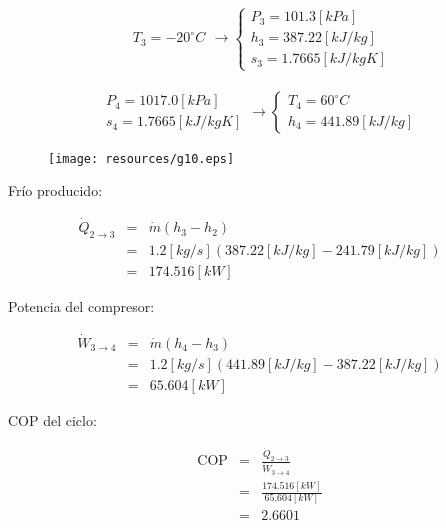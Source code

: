 \documentclass[letter,10pt]{article}
\begin{document}
\begin{enumerate}
\begin{eqnarray*}
    \begin{array}{c}
        T_3 = -20^\circ C
    \end{array}
    \rightarrow
    \begin{cases}
        P_3 = 101.3[kPa] \\
        h_3 = 387.22[kJ/kg] \\
        s_3 = 1.7665[kJ/kg K]
    \end{cases}
\end{eqnarray*}

\begin{eqnarray*}
    \begin{array}{c}
        P_4 = 1017.0[kPa] \\
        s_4 = 1.7665[kJ/kg K]
    \end{array}
    \rightarrow
    \begin{cases}
        T_4 = 60^\circ C \\
        h_4 = 441.89[kJ/kg]
    \end{cases}
\end{eqnarray*}

\begin{figure}[H]
\centering
\texttt{[image: resources/g10.eps]}
\end{figure}

Frío producido:

\begin{eqnarray*}
    \dot{Q}_{2\rightarrow3} &=& \dot{m}(h_3 - h_2) \\
                            &=& 1.2[kg/s](387.22[kJ/kg]-241.79[kJ/kg]) \\
                            &=& 174.516[kW]
\end{eqnarray*}

Potencia del compresor:

\begin{eqnarray*}
    \dot{W}_{3\rightarrow4} &=& \dot{m}(h_4 - h_3) \\
                            &=& 1.2[kg/s](441.89[kJ/kg]-387.22[kJ/kg]) \\
                            &=& 65.604[kW]
\end{eqnarray*}

COP del ciclo:

\begin{eqnarray*}
    \text{COP} &=& \frac{\dot{Q}_{2\rightarrow3}}{\dot{W}_{3\rightarrow4}} \\
               &=& \frac{174.516[kW]}{65.604[kW]} \\
               &=& 2.6601
\end{eqnarray*}


\end{enumerate}
\end{document}

